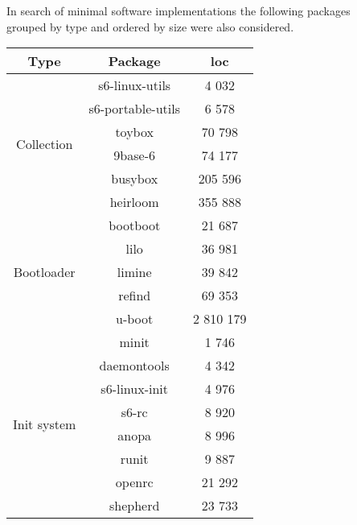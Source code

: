 In search of minimal software implementations the following packages\\ grouped by type and ordered by size were also considered.

\begin{table}[!ht]
    \centering
    \begin{tabular}{|c|c|c|}
        \hline
        Type & Package & \gls{loc} \\
        \hline
        \hline
        \multirow{6}{*}{Collection}
        & s6-linux-utils \cite{s6-linux} & 4 032 \\
        \cline{2-3}
        & s6-portable-utils \cite{s6-portable} & 6 578 \\
        \cline{2-3}
        & toybox \cite{toybox} & 70 798 \\
        \cline{2-3}
        & 9base-6 \cite{9base} & 74 177 \\
        \cline{2-3}
        & busybox \cite{busybox} & 205 596 \\
        \cline{2-3}
        & heirloom \cite{heirloom} \footnotemark[3] & 355 888 \\
        \hline
        \hline
        \multirow{5}{*}{Bootloader}
        & bootboot \cite{bootboot} & 21 687 \\
        \cline{2-3}
        & lilo \cite{lilo} & 36 981 \\
        \cline{2-3}
        & limine \cite{limine} & 39 842 \\
        \cline{2-3}
        & refind \cite{refind} & 69 353 \\
        \cline{2-3}
        & u-boot \cite{uboot} & 2 810 179 \\
        \hline
        \hline
        \multirow{11}{*}{Init system}
        & minit \cite{minit} & 1 746 \\
        \cline{2-3}
        & daemontools \cite{daemontools} & 4 342 \\
        \cline{2-3}
        & s6-linux-init \cite{s6-linux-init} & 4 976 \\
        \cline{2-3}
        & s6-rc \cite{s6-rc} & 8 920 \\
        \cline{2-3}
        & anopa \cite{anopa} & 8 996 \\
        \cline{2-3}
        & runit \cite{runit} & 9 887 \\
        \cline{2-3}
        & openrc \cite{openrc} & 21 292 \\
        \cline{2-3}
        & shepherd \cite{shepherd} & 23 733 \\ %

\end{tabular}
\end{table}
